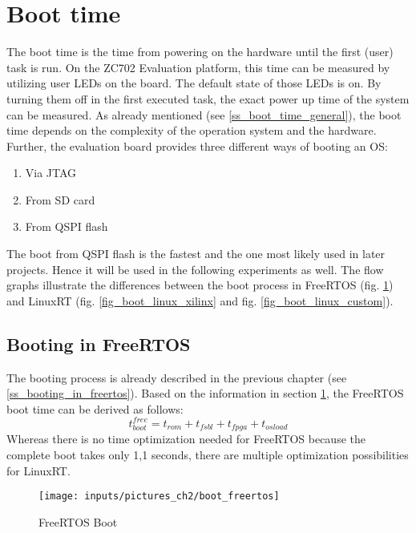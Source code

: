 \section{Boot time}\label{s_boot_time}
The boot time is the time from powering on the hardware until the first (user) task is run. 
On the ZC702 Evaluation platform, this time can be measured by utilizing user \acp{LED} on the board.  
The default state of those \acp{LED} is on.
By turning them off in the first executed task, the exact power up time of the system can be measured.  
As already mentioned (see \ref{ss_boot_time_general}), the boot time depends on the complexity of the operation system and the hardware. 
Further, the evaluation board provides three different ways of booting an \ac{OS}:
\begin{enumerate}
	\item Via \ac{JTAG}
	\item From \ac{SD} card
	\item From \ac{QSPI} flash
\end{enumerate}
The boot from \ac{QSPI} flash is the fastest and the one most likely used in later projects.
Hence it will be used in the following experiments as well.
The flow graphs illustrate the differences between the boot process in FreeRTOS (fig. \ref{fig_boot_freertos}) and LinuxRT (fig. \ref{fig_boot_linux_xilinx} and fig. \ref{fig_boot_linux_custom}).

\subsection{Booting in FreeRTOS}
The booting process is already described in the previous chapter (see \ref{ss_booting_in_freertos}).
Based on the information in section \ref{s_boot_time}, the FreeRTOS boot time can be derived as follows:
	\begin{equation}
		t_{boot}^{free} = t_{rom} + t_{fsbl} +  t_{fpga} + t_{osload} \label{eq_t_boot_free} 
	\end{equation}
Whereas there is no time optimization needed for FreeRTOS because the complete boot takes only 1,1 seconds, there are multiple optimization possibilities for LinuxRT. 

\begin{figure}[htb]
		\begin{center}
			\texttt{[image: inputs/pictures\_ch2/boot\_freertos]}
			\caption[FreeRTOS boot]{FreeRTOS Boot \cite{xilinx:zbff}} \label{fig_boot_freertos}
		\end{center}
\end{figure} 

